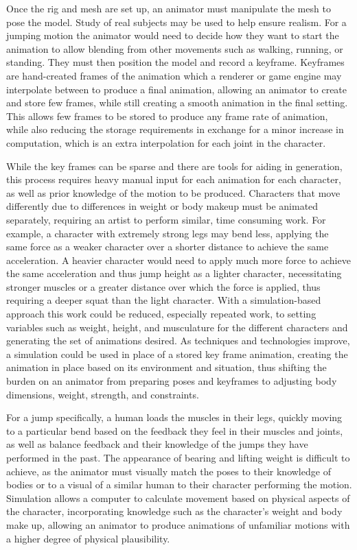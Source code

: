 Once the rig and mesh are set up, an animator must manipulate the mesh to pose the model.  Study of real subjects may be used to help ensure realism.  For a jumping motion the animator would need to decide how they want to start the animation to allow blending from other movements such as walking, running, or standing.  They must then position the model and record a keyframe.  Keyframes are hand-created frames of the animation which a renderer or game engine may interpolate between to produce a final animation, allowing an animator to create and store few frames, while still creating a smooth animation in the final setting.  This allows few frames to be stored to produce any frame rate of animation, while also reducing the storage requirements in exchange for a minor increase in computation, which is an extra interpolation for each joint in the character.

While the key frames can be sparse and there are tools for aiding in generation, this process requires heavy manual input for each animation for each character, as well as prior knowledge of the motion to be produced.  Characters that move differently due to differences in weight or body makeup must be animated separately, requiring an artist to perform similar, time consuming work.  For example, a character with extremely strong legs may bend less, applying the same force as a weaker character over a shorter distance to achieve the same acceleration.  A heavier character would need to apply much more force to achieve the same acceleration and thus jump height as a lighter character, necessitating stronger muscles or a greater distance over which the force is applied, thus requiring a deeper squat than the light character.  With a simulation-based approach this work could be reduced, especially repeated work, to setting variables such as weight, height, and musculature for the different characters and generating the set of animations desired.  As techniques and technologies improve, a simulation could be used in place of a stored key frame animation, creating the animation in place based on its environment and situation, thus shifting the burden on an animator from preparing poses and keyframes to adjusting body dimensions, weight, strength, and constraints.

For a jump specifically, a human loads the muscles in their legs, quickly moving to a particular bend based on the feedback they feel in their muscles and joints, as well as balance feedback and their knowledge of the jumps they have performed in the past.  The appearance of bearing and lifting weight is difficult to achieve, as the animator must visually match the poses to their knowledge of bodies or to a visual of a similar human to their character performing the motion.  Simulation allows a computer to calculate movement based on physical aspects of the character, incorporating knowledge such as the character's weight and body make up, allowing an animator to produce animations of unfamiliar motions with a higher degree of physical plausibility.

